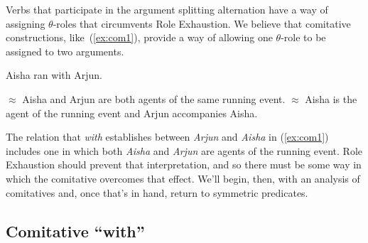 \documentclass[twoside, 12pt]{article}
\begin{document}
Verbs that participate in the argument splitting alternation have a way of assigning $\theta$-roles that circumvents Role Exhaustion. We believe that comitative constructions, like~(\ref{ex:com1}), provide a way of allowing one $\theta$-role to be assigned to two arguments. 
\begin{exe}
\raggedright
  \ex \label{ex:com1} Aisha ran with Arjun.
  \begin{xlist}
    \ex $\approx$ Aisha and Arjun are both agents of the same running event.
    \ex $\approx$ Aisha is the agent of the running event and Arjun accompanies Aisha.
  \end{xlist}
\end{exe}
The relation that \textit{with} establishes between \textit{Arjun} and \textit{Aisha} in (\ref{ex:com1}) includes one in which both \textit{Aisha} and \textit{Arjun} are agents of the running event. Role Exhaustion should prevent that interpretation, and so there must be some way in which the comitative overcomes that effect. We'll begin, then, with an analysis of comitatives and, once that's in hand, return to symmetric predicates.

\subsection{Comitative ``with''}
\end{document}
